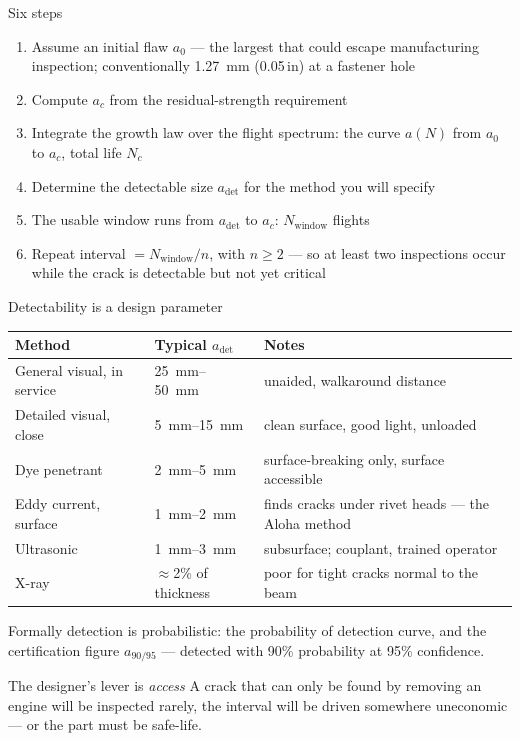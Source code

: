\documentclass[aspectratio=169,10pt]{beamer}
\begin{document}
\begin{frame}{Six steps}
\begin{enumerate}\scriptsize
  \item Assume an initial flaw $a_0$ --- the largest that could escape manufacturing inspection; conventionally \SI{1.27}{mm} (0.05\,in) at a fastener hole
  \item Compute $a_c$ from the residual-strength requirement
  \item Integrate the growth law over the flight spectrum: the curve $a(N)$ from $a_0$ to $a_c$, total life $N_c$
  \item Determine the \alert{detectable} size $a_{\mathrm{det}}$ for the method you will specify
  \item The usable window runs from $a_{\mathrm{det}}$ to $a_c$: $N_{\mathrm{window}}$ flights
  \item Repeat interval $=N_{\mathrm{window}}/n$, with $n\ge2$ --- so at least two inspections occur while the crack is detectable but not yet critical
\end{enumerate}
\centering
\scalebox{0.86}{}
\end{frame}

\begin{frame}{Detectability is a design parameter}
\centering\footnotesize
\begin{tabular}{@{}llp{6.8cm}@{}}
\toprule
Method & Typical $a_{\mathrm{det}}$ & Notes \\
\midrule
General visual, in service & \SIrange{25}{50}{mm} & unaided, walkaround distance \\
Detailed visual, close & \SIrange{5}{15}{mm} & clean surface, good light, unloaded \\
Dye penetrant & \SIrange{2}{5}{mm} & surface-breaking only, surface accessible \\
Eddy current, surface & \SIrange{1}{2}{mm} & finds cracks under rivet heads --- the Aloha method \\
Ultrasonic & \SIrange{1}{3}{mm} & subsurface; couplant, trained operator \\
X-ray & $\approx$2\% of thickness & poor for tight cracks normal to the beam \\
\bottomrule
\end{tabular}
\vspace{4pt}

\raggedright\normalsize
Formally detection is probabilistic: the \alert{probability of detection} curve, and the certification figure $a_{90/95}$ --- detected with 90\% probability at 95\% confidence.
\begin{alertblock}{The designer's lever is \emph{access}}
A crack that can only be found by removing an engine will be inspected rarely, the interval will be driven somewhere uneconomic --- or the part must be safe-life.
\end{alertblock}
\end{frame}
\end{document}
